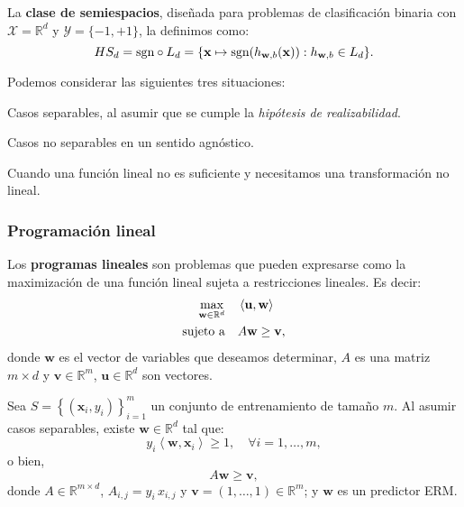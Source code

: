 \documentclass[8pt,a4paper]{extarticle}
\begin{document}
\begin{multicols}{3}
	\begin{boxdef}
		La \textbf{clase de semiespacios}, diseñada para problemas de clasificación binaria con $\mathcal{X} = \mathbb{R}^d$ y $\mathcal{Y} = \{-1, +1\} $, la definimos como:
		\[
			HS_d = \text{\normalfont sgn} \circ L_{d} = \{\mathbf{x} \mapsto \text{\normalfont sgn}(h_{\mathbf{w}, b} (\mathbf{x})) : h_{\mathbf{w}, b} \in L_d\}
			.\]
	\end{boxdef}

	Podemos considerar las siguientes tres situaciones:

	\begin{numberlist}
		\item Casos separables, al asumir que se cumple la \emph{hipótesis de realizabilidad}.
		\item Casos no separables en un sentido agnóstico.
		\item[\textcolor{dred}{3.}] Cuando una función lineal no es suficiente y necesitamos una transformación no lineal.
	\end{numberlist}

	\subsubsection{Programación lineal}

	\begin{boxdef}
		Los \textbf{programas lineales} son problemas que pueden expresarse como la maximización de una función lineal sujeta a restricciones lineales. Es decir:
		\begin{align*}
			\max_{\mathbf{w} \in \mathbb{R}^d} \quad & \left<\mathbf{u}, \mathbf{w} \right> \\
			\text{\normalfont sujeto a} \quad        & A\mathbf{w} \ge \mathbf{v}
			,\end{align*}
		donde $ \mathbf{w}$ es el vector de variables que deseamos determinar, $A$ es una matriz  $m \times d$ y $ \mathbf{v} \in \mathbb{R}^m$, $ \mathbf{u} \in \mathbb{R}^d$ son vectores.
	\end{boxdef}

	\begin{boxprop}[]
		Sea $\displaystyle S = \left\{ \left( \mathbf{x}_i, y_i \right)  \right\}_{i = 1}^m $ un conjunto de entrenamiento de tamaño $m$. Al asumir casos separables, existe  $ \mathbf{w} \in \mathbb{R}^d$ tal que:
		\[
			y_i \left< \mathbf{w}, \mathbf{x}_i \right> \ge 1, \quad \forall i = 1, \ldots, m
			,\]
		o bien,
		\[
			A\mathbf{w} \ge \mathbf{v}
			,\]
		donde $A \in \mathbb{R}^{m \times d}$, $A_{i,j} = y_i\, x_{i,j}$ y $ \mathbf{v} = (1, \ldots, 1) \in \mathbb{R}^m$; y $ \mathbf{w}$ es un predictor ERM.
	\end{boxprop}


\end{multicols}
\end{document}
